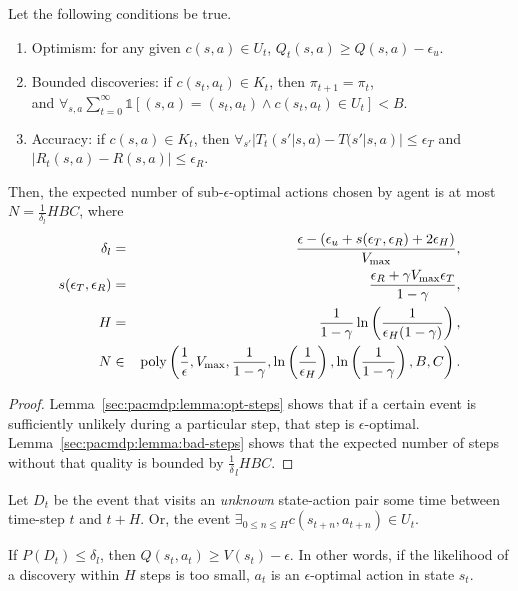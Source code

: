 \begin{thm}
Let the following conditions be true.
\begin{enumerate}
\item
\label{sec:pacmdp:cond:opt}
Optimism: for any given $c(s,a) \in U_t$, $Q_t(s,a) \geq Q(s,a) - \epsilon_u$.
\item
\label{sec:pacmdp:cond:bounded}
Bounded discoveries: if $c(s_t, a_t) \in K_t$, then $\pi_{t+1} = \pi_{t}$,\\ and $\forall_{s,a} \sum_{t=0}^\infty \mathbb{1}\left[(s,a) = (s_t,a_t) \wedge c(s_t,a_t) \in U_t\right] < B$.
\item
\label{sec:pacmdp:cond:acc}
Accuracy: if $c(s,a) \in K_t$, then $\forall_{s'}|T_t(s'|s,a)-T(s'|s,a)| \leq \epsilon_T$ and $|R_t(s,a)-R(s,a)|\leq\epsilon_R$.
\end{enumerate}
Then, the expected number of sub-$\epsilon$-optimal actions chosen by agent \A is at most $N = \frac 1 {\delta_l} H B C$, where
\begin{eqnarray}
\delta_l &=& \frac {\epsilon - (\epsilon_u + s(\epsilon_T,\epsilon_R) +2 \epsilon_H)} {V_{\rm max}},\\
s(\epsilon_T,\epsilon_R) &=& \frac {\epsilon_R + \gamma V_{\rm max} \epsilon_T} {1-\gamma},\\
H&=&\frac 1 {1-\gamma} \ln\left(\frac 1 {\epsilon_H (1-\gamma)}\right),\\
N&\in&\mbox{poly}\left(\frac 1 \epsilon, V_{\rm max}, \frac{1}{1-\gamma}, \ln\left(\frac 1 {\epsilon_H}\right), \ln \left(\frac{1}{1-\gamma}\right), B, C\right).
\end{eqnarray}
\end{thm}

\begin{proof}
Lemma~\ref{sec:pacmdp:lemma:opt-steps} shows that if a certain event is sufficiently unlikely during a particular step, that step is $\epsilon$-optimal. Lemma~\ref{sec:pacmdp:lemma:bad-steps} shows that the expected number of steps without that quality is bounded by $\frac 1 \delta_l H B C$.
\end{proof}

\begin{defn}
Let $D_t$ be the event that \A visits an \emph{unknown} state-action pair some time between time-step $t$ and $t+H$. Or, the event $\exists_{0\leq n\leq H} c(s_{t+n},a_{t+n}) \in U_t$.
\end{defn}

\begin{lemma}
\label{sec:pacmdp:lemma:opt-steps}
If $P(D_t) \leq \delta_l$, then $Q(s_t,a_t) \geq V(s_t) - \epsilon$. In other words, if the likelihood of a discovery within $H$ steps is too small, $a_t$ is an $\epsilon$-optimal action in state $s_t$.
\end{lemma}


